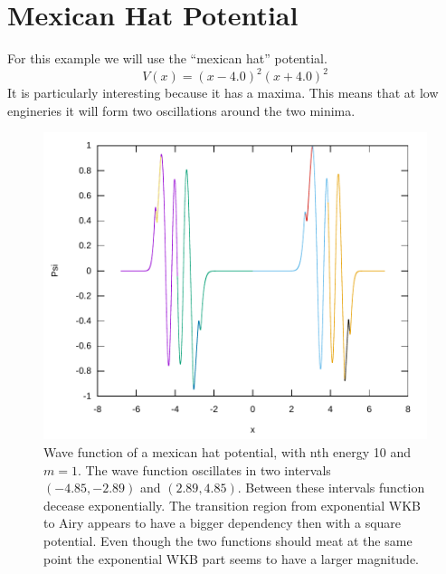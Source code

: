 \documentclass[11pt,DIV=10,final]{scrreprt} %
\begin{document}
\section{Mexican Hat Potential}
For this example we will use the ``mexican hat'' potential.
\[
  V(x) = {(x - 4.0)}^{2} {(x + 4.0)}^{2}
\]
It is particularly interesting because it has a maxima. This means that at low engineries it will form two oscillations around the two minima.
\begin{figure}[H]
  \centering
  \includegraphics[width=\textwidth]{plots/mexican-hat-10.pdf}
  \caption{Wave function of a mexican hat potential, with nth energy 10 and $m = 1$. The wave function oscillates in two intervals $(-4.85, -2.89)$ and $(2.89, 4.85)$. Between these intervals
  function decease exponentially. The transition region from exponential WKB to Airy appears to have a bigger dependency then with a square potential. Even though the two functions should meat at the same point the exponential WKB part seems to have a larger magnitude.}
\end{figure}
\end{document}
